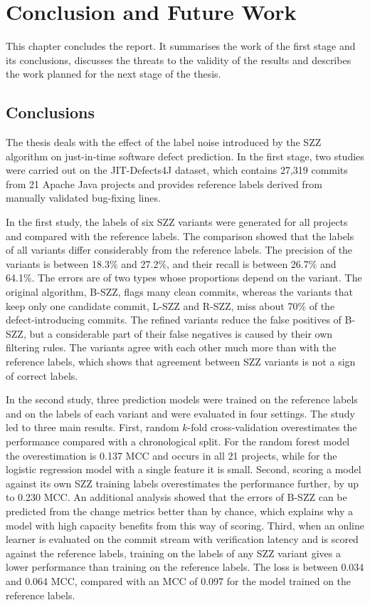 \documentclass[12pt,a4paper,oneside]{report}
\begin{document}
\chapter{Conclusion and Future Work}\label{ch:conclusion}

This chapter concludes the report. It summarises the work of the first stage
and its conclusions, discusses the threats to the validity of the results and
describes the work planned for the next stage of the thesis.

\section{Conclusions}

The thesis deals with the effect of the label noise introduced by the SZZ
algorithm on just-in-time software defect prediction. In the first stage,
two studies were carried out on the JIT-Defects4J dataset, which contains
27,319 commits from 21 Apache Java projects and provides reference labels
derived from manually validated bug-fixing lines.

In the first study, the labels of six SZZ variants were generated for all
projects and compared with the reference labels. The comparison showed that
the labels of all variants differ considerably from the reference labels.
The precision of the variants is between 18.3\% and 27.2\%, and their recall
is between 26.7\% and 64.1\%. The errors are of two types whose proportions
depend on the variant. The original algorithm, B-SZZ, flags many clean
commits, whereas the variants that keep only one candidate commit, L-SZZ and
R-SZZ, miss about 70\% of the defect-introducing commits. The refined
variants reduce the false positives of B-SZZ, but a considerable part of
their false negatives is caused by their own filtering rules. The variants
agree with each other much more than with the reference labels, which shows
that agreement between SZZ variants is not a sign of correct labels.

In the second study, three prediction models were trained on the reference
labels and on the labels of each variant and were evaluated in four settings.
The study led to three main results. First, random $k$-fold cross-validation
overestimates the performance compared with a chronological split. For the
random forest model the overestimation is 0.137 MCC and occurs in all 21
projects, while for the logistic regression model with a single feature it is
small. Second, scoring a model against its own SZZ training labels
overestimates the performance further, by up to 0.230 MCC. An additional
analysis showed that the errors of B-SZZ can be predicted from the change
metrics better than by chance, which explains why a model with high capacity
benefits from this way of scoring. Third, when an online learner is evaluated
on the commit stream with verification latency and is scored against the
reference labels, training on the labels of any SZZ variant gives a lower
performance than training on the reference labels. The loss is between 0.034
and 0.064 MCC, compared with an MCC of 0.097 for the model trained on the
reference labels.
\end{document}
